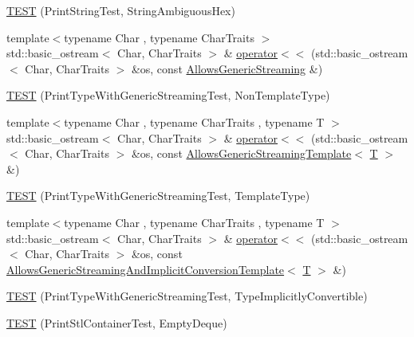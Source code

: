 \begin{DoxyCompactItemize}
\hyperlink{namespacetesting_1_1gtest__printers__test_ac20ee165500471e363011c3f664d2fb8}{T\+E\+ST} (Print\+String\+Test, String\+Ambiguous\+Hex)
\item 
{\footnotesize template$<$typename Char , typename Char\+Traits $>$ }\\std\+::basic\+\_\+ostream$<$ Char, Char\+Traits $>$ \& \hyperlink{namespacetesting_1_1gtest__printers__test_a1eb0213095e639d357692066e8505887}{operator$<$$<$} (std\+::basic\+\_\+ostream$<$ Char, Char\+Traits $>$ \&os, const \hyperlink{classtesting_1_1gtest__printers__test_1_1_allows_generic_streaming}{Allows\+Generic\+Streaming} \&)
\item 
\hyperlink{namespacetesting_1_1gtest__printers__test_a9272037c799c4779e1d79476dad66cb6}{T\+E\+ST} (Print\+Type\+With\+Generic\+Streaming\+Test, Non\+Template\+Type)
\item 
{\footnotesize template$<$typename Char , typename Char\+Traits , typename T $>$ }\\std\+::basic\+\_\+ostream$<$ Char, Char\+Traits $>$ \& \hyperlink{namespacetesting_1_1gtest__printers__test_a5464168e925b1adf29986c8e544e908e}{operator$<$$<$} (std\+::basic\+\_\+ostream$<$ Char, Char\+Traits $>$ \&os, const \hyperlink{classtesting_1_1gtest__printers__test_1_1_allows_generic_streaming_template}{Allows\+Generic\+Streaming\+Template}$<$ \hyperlink{functions__7_8js_adf1f3edb9115acb0a1e04209b7a9937b}{T} $>$ \&)
\item 
\hyperlink{namespacetesting_1_1gtest__printers__test_a6e180c85f307712a995985f7bc735fd1}{T\+E\+ST} (Print\+Type\+With\+Generic\+Streaming\+Test, Template\+Type)
\item 
{\footnotesize template$<$typename Char , typename Char\+Traits , typename T $>$ }\\std\+::basic\+\_\+ostream$<$ Char, Char\+Traits $>$ \& \hyperlink{namespacetesting_1_1gtest__printers__test_a09eedfbca613302efe6438d2a537f419}{operator$<$$<$} (std\+::basic\+\_\+ostream$<$ Char, Char\+Traits $>$ \&os, const \hyperlink{classtesting_1_1gtest__printers__test_1_1_allows_generic_streaming_and_implicit_conversion_template}{Allows\+Generic\+Streaming\+And\+Implicit\+Conversion\+Template}$<$ \hyperlink{functions__7_8js_adf1f3edb9115acb0a1e04209b7a9937b}{T} $>$ \&)
\item 
\hyperlink{namespacetesting_1_1gtest__printers__test_a68877c5e1ec7a53281798310c30e1776}{T\+E\+ST} (Print\+Type\+With\+Generic\+Streaming\+Test, Type\+Implicitly\+Convertible)
\item 
\hyperlink{namespacetesting_1_1gtest__printers__test_a1ce10b8a3634e0f6bfbfbb5888c04a95}{T\+E\+ST} (Print\+Stl\+Container\+Test, Empty\+Deque)

\end{DoxyCompactItemize}
